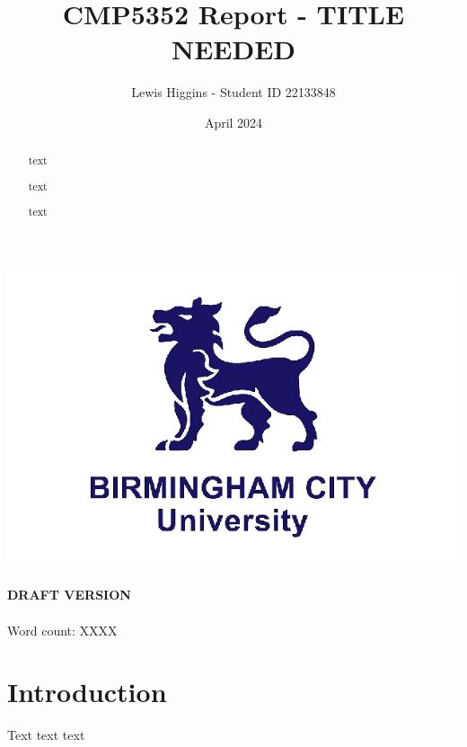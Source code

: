 \documentclass[12pt]{report}\usepackage[]{graphicx}\usepackage[]{xcolor}
\title{CMP5352 Report - TITLE NEEDED}
\author{Lewis Higgins - Student ID 22133848}
\date{April 2024}
\begin{document}
 \pagecolor{yellow} %

    \makeatletter
    \begin{titlepage}
        \begin{center}
            \includegraphics[width=0.7\linewidth]{bcu logo}\\[4ex]
            {\large \bfseries  \@title }\\[2ex]
            {\large \bfseries  DRAFT VERSION }\\[2ex]
            {\@author}\\[30ex]
            {Word count: XXXX}\\[20ex]
        \end{center}
    \end{titlepage}
    \makeatother
    \thispagestyle{empty}
    \newpage

    \pagecolor{white}

    \begin{abstract}
        text

        text

        text

    \end{abstract}

    \setcounter{page}{0} %

    \tableofcontents
    \thispagestyle{empty}

    \chapter*{Introduction}\label{ch:introduction}

    Text text text
\end{document}
